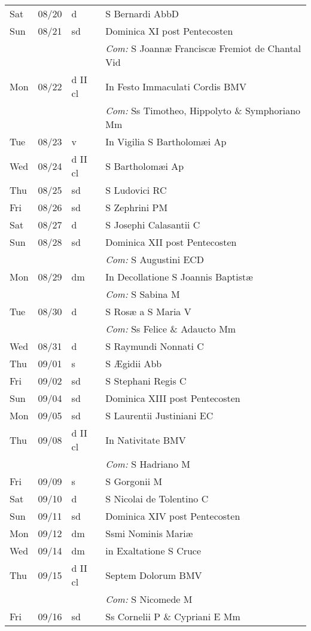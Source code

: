 \documentclass[10pt]{article}
\begin{document}
\begin{longtable}{ l l l l }
Sat & 08/20 & d & S Bernardi AbbD\\
Sun & 08/21 & sd & Dominica XI post Pentecosten\\
 & & & \textit{Com:} S Joannæ Franciscæ Fremiot de Chantal Vid\\
Mon & 08/22 & d II cl & In Festo Immaculati Cordis BMV\\
 & & & \textit{Com:} Ss Timotheo, Hippolyto \& Symphoriano Mm\\
Tue & 08/23 & v & In Vigilia S Bartholomæi Ap\\
Wed & 08/24 & d II cl & S Bartholomæi Ap\\
Thu & 08/25 & sd & S Ludovici RC\\
Fri & 08/26 & sd & S Zephrini PM\\
Sat & 08/27 & d & S Josephi Calasantii C\\
Sun & 08/28 & sd & Dominica XII post Pentecosten\\
 & & & \textit{Com:} S Augustini ECD\\
Mon & 08/29 & dm & In Decollatione S Joannis Baptistæ\\
 & & & \textit{Com:} S Sabina M\\
Tue & 08/30 & d & S Rosæ a S Maria V\\
 & & & \textit{Com:} Ss Felice \& Adaucto Mm\\
Wed & 08/31 & d & S Raymundi Nonnati C\\
Thu & 09/01 & s & S Ægidii Abb\\
Fri & 09/02 & sd & S Stephani Regis C\\
Sun & 09/04 & sd & Dominica XIII post Pentecosten\\
Mon & 09/05 & sd & S Laurentii Justiniani EC\\
Thu & 09/08 & d II cl & In Nativitate BMV\\
 & & & \textit{Com:} S Hadriano M\\
Fri & 09/09 & s & S Gorgonii M\\
Sat & 09/10 & d & S Nicolai de Tolentino C\\
Sun & 09/11 & sd & Dominica XIV post Pentecosten\\
Mon & 09/12 & dm & Ssmi Nominis Mariæ\\
Wed & 09/14 & dm & in Exaltatione S Cruce\\
Thu & 09/15 & d II cl & Septem Dolorum BMV\\
 & & & \textit{Com:} S Nicomede M\\
Fri & 09/16 & sd & Ss Cornelii P \& Cypriani E Mm\\

\end{longtable}
\end{document}
